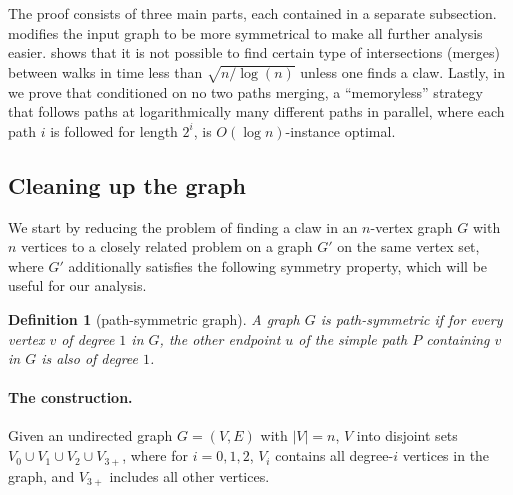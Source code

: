 \documentclass[11pt]{article}
\numberwithin{equation}{section}
\newtheorem{theorem}{Theorem}[section]
\newtheorem{definition}[definition]{Definition}
\renewcommand{\P}{\mathcal{P}}
\newcommand{\1}{\mathbf{1}}
\begin{document}
\iffalse
\begin{theorem}[Near-instance optimality in the sub-random regime] 

Let $\mathcal{P_C}$ be the property of finding a collision in a function $f$. Let $\mathcal{C}$ be the set of all functions $f \colon [n] \to [n]$ for which $\RACC(\mathcal{P_C}, f) \in \Omega(\sqrt{n} / \log n)$. That is, its unlableled certificate complexity is $\Omega(\sqrt{n} / \log n)$. There exists a universal Las Vegas algorithm (without access to an unlabeled certificate) that finds a collision in $(O(\RACC(\mathcal{P_C}, f)) \cdot \log(n)$ for any $f \in \mathcal{C}$.

The same statement is true for equivalence classes of graphs on $n$ vertices, with respect to the property $\P_{S_3}$.
\end{theorem}
\fi


The proof consists of three main parts, each contained in a separate subsection.  modifies the input graph to be more symmetrical to make all further analysis easier.  shows that it is not possible to find certain type of intersections (merges) between walks in time less than $\sqrt{n/\log(n)}$ unless one finds a claw. Lastly, in  we prove that conditioned on no two paths merging, a ``memoryless'' strategy that follows paths at logarithmically many different paths in parallel, where each path $i$ is followed for length $2^i$,
is $O(\log n)$-instance optimal. 

\subsection{Cleaning up the graph} \label{cleaning}
We start by reducing the problem of finding a claw in an $n$-vertex graph $G$ with $n$ vertices to a closely related problem on a graph $G'$ on the same vertex set, where $G'$ additionally satisfies the following symmetry property, which will be useful for our analysis.

\begin{definition}[path-symmetric graph]
A graph $G$ is \emph{path-symmetric} if for every vertex $v$ of degree $1$ in $G$, the other endpoint $u$ of the simple path $P$ containing $v$ in $G$ is also of degree $1$.
\end{definition}

\paragraph{The construction.} Given an undirected graph $G = (V,E)$ with $|V| = n$, $V$ into disjoint sets $V_0 \cup V_1 \cup V_2 \cup V_{3+}$, where for $i=0,1,2$, $V_i$ contains all degree-$i$ vertices in the graph, and $V_{3+}$ includes all other vertices. 
\end{document}
